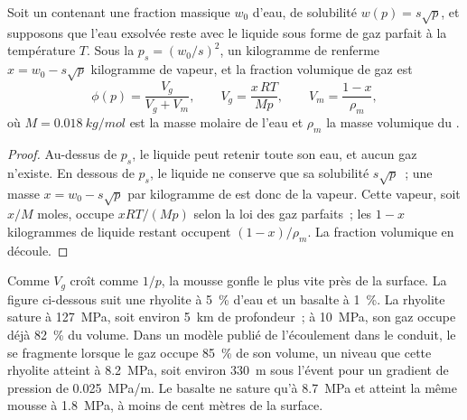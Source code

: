 \begin{proposition}\label{prop:b2:eruptive-styles:gas}
Soit un  contenant une fraction massique $w_0$ d'eau, de solubilité $w(p) =
s\sqrt p$, et supposons que l'eau exsolvée reste avec le liquide sous forme de gaz parfait
à la température $T$. Sous la  $p_s = (w_0/s)^2$, un kilogramme de
 renferme $x = w_0 - s\sqrt p$ kilogramme de vapeur, et la fraction volumique
de gaz est
\[
\phi(p) = \frac{V_g}{V_g + V_m}, \qquad V_g = \frac{x\,RT}{M p}, \qquad
V_m = \frac{1 - x}{\rho_m},
\]
où $M = \qty{0.018}{kg/mol}$ est la masse molaire de l'eau et $\rho_m$ la masse volumique
du .
\end{proposition}

\begin{proof}
Au-dessus de $p_s$, le liquide peut retenir toute son eau, et aucun gaz n'existe. En dessous de $p_s$, le
liquide ne conserve que sa solubilité $s\sqrt p$~; une masse $x = w_0 - s\sqrt p$ par
kilogramme de  est donc de la vapeur. Cette vapeur, soit $x/M$ moles, occupe $xRT/(Mp)$ selon
la loi des gaz parfaits~; les $1 - x$ kilogrammes de liquide restant occupent $(1 - x)/\rho_m$.
La fraction volumique en découle.
\end{proof}

Comme $V_g$ croît comme $1/p$, la mousse gonfle le plus vite près de la surface. La
figure ci-dessous suit une rhyolite à \qty{5}{\percent} d'eau et un basalte
à \qty{1}{\percent}. La rhyolite sature à \qty{127}{MPa}, soit environ
\qty{5}{km} de profondeur~; à \qty{10}{MPa}, son gaz occupe déjà \qty{82}{\percent} du
volume. Dans un modèle publié de l'écoulement dans le conduit, le  se fragmente lorsque le
gaz occupe \qty{85}{\percent} de son volume, un niveau que cette rhyolite atteint à
\qty{8.2}{MPa}, soit environ \qty{330}{m} sous l'évent pour un gradient de pression de
\qty{0.025}{MPa/m}. Le basalte ne sature qu'à \qty{8.7}{MPa} et atteint la même
mousse à \qty{1.8}{MPa}, à moins de cent mètres de la surface.

